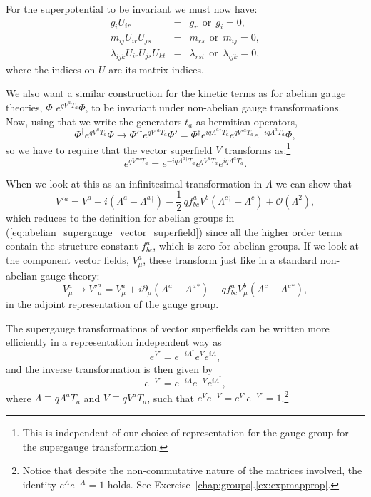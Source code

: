 \documentclass[notes.tex]{subfiles}
\begin{document}
For the superpotential to be invariant we must now have:
\begin{eqnarray}
g_iU_{ir} &=& g_r ~~\text{or}~~ g_i = 0, \\
m_{ij}U_{ir} U_{js} &=& m_{rs} ~~\text{or}~~m_{ij}=0, \\
 \lambda_{ijk}U_{ir} U_{js}U_{kt}&=& \lambda_{rst} ~~\text{or}~~\lambda_{ijk}=0,
\end{eqnarray}
where the indices on $U$ are its matrix indices. 

We also want a similar construction for the kinetic terms as for abelian gauge theories, $\Phi^\dagger e^{qV^aT_a}\Phi$, to be invariant under non-abelian gauge transformations. Now, using that we write the generators $t_a$ as hermitian operators, 
\[\Phi^\dagger e^{qV^aT_a}\Phi \to \Phi'{}^\dagger e^{qV'{}^aT_a}\Phi' = \Phi{}^\dagger e^{iq\Lambda^a{}^\dagger T_a} e^{qV'{}^aT_a}e^{-iq\Lambda^aT_a}\Phi,\]
so we have to require that the vector superfield $V$ transforms as:\footnote{This is independent of our choice of representation for the gauge group for the supergauge transformation.}
\begin{equation}
e^{qV'{}^aT_a} = e^{-iq\Lambda^a{}^\dagger T_a}e^{qV^aT_a} e^{iq\Lambda^a T_a}.
\end{equation}

When we look at this as an infinitesimal transformation in $\Lambda$ we can show that
\[V'{}^a = V^a + i(\Lambda^a-\Lambda^{a}{}^\dagger) - \frac{1}{2}\,q f_{bc}^a V^b(\Lambda^c{}^\dagger + \Lambda^c) +{\mathcal O}(\Lambda^2),\]
which reduces to the definition for abelian groups in (\ref{eq:abelian_supergauge_vector_superfield}) since all the higher order terms contain the structure constant $f_{bc}^a$, which is zero for abelian groups. If we look at the component vector fields, $V^a_\mu$, these transform just like in a standard non-abelian  gauge theory:
\[V^a_\mu \to V'^{a}_\mu = V^{a}_\mu + i\partial_\mu(A^a - A^a{}^*) - qf_{bc}^{a}V^b_\mu(A^c - A^c{}^*),\]
in the adjoint representation of the gauge group.

The supergauge transformations of vector superfields can be written more efficiently in a representation independent way as
\[e^{V'} = e^{-i\Lambda^\dagger}e^V e^{i\Lambda},\]
and the inverse transformation is then given by
\[e^{-V'} = e^{-i\Lambda}e^{-V} e^{i\Lambda^\dagger},\]
where $\Lambda \equiv q \Lambda^aT_a$ and $V \equiv q V^aT_a$, such that $e^Ve^{-V} = e^{V'}e^{-V'} = 1$.\footnote{Notice that despite the non-commutative nature of the matrices involved, the identity $e^{A}e^{-A}=1$ holds. See Exercise~\ref{chap:groups}.\ref{ex:expmapprop}.}
\end{document}
